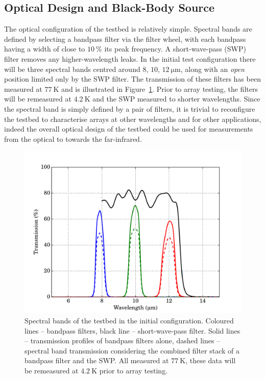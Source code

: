 \documentclass{spie}
\begin{document}
\subsection{Optical Design and Black-Body Source}\label{ssec:opticalDesign}
The optical configuration of the testbed is relatively simple. Spectral bands are defined by selecting a bandpass filter via the filter wheel, with each bandpass having a width of close to $10~\%$ its peak frequency. A short-wave-pass (SWP) filter removes any higher-wavelength leaks. In the initial test configuration there will be three spectral bands centred around $8$, $10$, $12~\si{\micro\metre}$, along with an \textit{open} position limited only by the SWP filter. The transmission of these filters has been measured at $77~\si{\kelvin}$ and is illustrated in Figure~\ref{fig:filters}. Prior to array testing, the filters will be remeasured at $4.2~\si{\kelvin}$ and the SWP measured to shorter wavelengths. Since the spectral band is simply defined by a pair of filters, it is trivial to reconfigure the testbed to characterise arrays at other wavelengths and for other applications, indeed the overall optical design of the testbed could be used for measurements from the optical to towards the far-infrared.
\begin{figure}[htb]
\begin{center}
\includegraphics[height=0.4\textheight]{MCTfiltersCombInterp}
\caption{Spectral bands of the testbed in the initial configuration. Coloured lines -- bandpass filters, black line -- short-wave-pass filter. Solid lines -- transmission profiles of bandpass filters alone, dashed lines -- spectral band transmission considering the combined filter stack of a bandpass filter and the SWP. All measured at $77~\si{\kelvin}$, these data will be remeasured at $4.2~\si{\kelvin}$ prior to array testing.}\label{fig:filters}
\end{center}
\end{figure}
\end{document}
